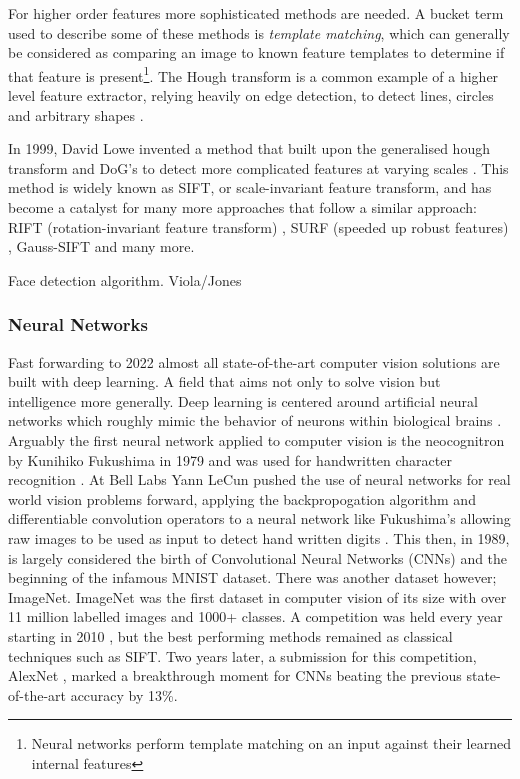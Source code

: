 For higher order features more sophisticated methods are needed.  A bucket term used to describe some of these methods is \textit{template matching},
which can generally be
considered as comparing an image to known feature templates to determine if that feature is present\footnote{Neural networks perform template matching
    on an input against their learned internal features}.  The Hough transform is a common example of a higher level feature extractor, relying heavily
on edge detection, to detect lines, circles and arbitrary shapes \cite{houghtransform}.

In 1999, David Lowe invented a method that built upon the generalised hough transform and DoG's to detect more complicated features at
varying scales \cite{lowe1999object}.
This method is widely known as SIFT, or scale-invariant feature transform, and has
become a catalyst for many more approaches that follow a similar approach: RIFT (rotation-invariant feature transform) \cite{rift}, SURF (speeded up robust features) \cite{bay2006surf},
Gauss-SIFT \cite{lindeberg2015image} and many more.

Face detection algorithm. Viola/Jones


\subsubsection{Neural Networks}
Fast forwarding to 2022 almost all state-of-the-art computer vision solutions are built with deep learning.  A field that aims not only to solve vision but intelligence
more generally.  Deep learning is centered around artificial neural networks which roughly mimic the behavior of neurons within biological brains \cite{eluyode2013comparative}.
Arguably the first neural network applied to computer vision is the neocognitron by Kunihiko Fukushima in 1979 and was used for handwritten character recognition \cite{fukushima1982neocognitron}.
At Bell Labs Yann LeCun pushed the use of neural networks for real world vision problems forward, applying the backpropogation algorithm and differentiable convolution operators to a 
neural network like Fukushima's allowing raw images to be used as input to detect hand written digits \cite{lecun1989backpropagation}.  
This then, in 1989, is largely considered the birth of Convolutional Neural Networks (CNNs) and the beginning of the infamous MNIST dataset.  There was another
dataset however; ImageNet.  ImageNet was the first dataset in computer vision of its size with over 11 million labelled images and 1000+ classes.  A competition was
held every year starting in 2010 \cite{deng2009imagenet}, but the best performing methods remained as classical techniques such as SIFT.
Two years later, a submission for this competition, AlexNet \cite{krizhevsky2012imagenet}, marked a breakthrough moment for CNNs beating the previous
state-of-the-art accuracy by 13\%.

